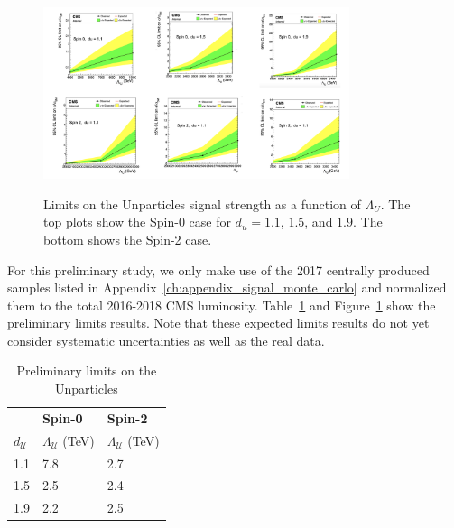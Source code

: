 \begin{figure}[!htbp]
    \caption{Limits on the Unparticles signal strength as a function of $\Lambda_U$. The top plots show the Spin-0 case for $d_u = 1.1$, $1.5$, and $1.9$. The bottom shows the Spin-2 case.}
    \centering
    \includegraphics[angle=0,width=0.8\textwidth]{fig/UnparticlesCountingExperiment.png}
    \label{fig:UnparLimPlots}
\end{figure}





For this preliminary study, we only make use of the 2017 centrally produced samples listed in Appendix~\ref{ch:appendix_signal_monte_carlo} and normalized them to the total 2016-2018 CMS luminosity. Table~\ref{tab:UnparLimitsPrelim} and Figure~\ref{fig:UnparLimPlots} show the preliminary limits results. Note that these expected limits results do not yet consider systematic uncertainties as well as the real data. 

\begin{table}[!htbp]
  \centering
  \caption{Preliminary limits on the Unparticles}
  \begin{tabular}{lll}
     & \textbf{Spin-0} & \textbf{Spin-2} \\
    $d_{\mathcal{U}}$ & $\Lambda_{\mathcal{U}}$ (TeV) & $\Lambda_{\mathcal{U}}$ (TeV) \\
    \hline
    1.1 & 7.8 & 2.7 \\
    1.5 & 2.5 & 2.4 \\
    1.9 & 2.2 & 2.5 \\
    \hline 
  \end{tabular}
  \label{tab:UnparLimitsPrelim}
\end{table}

